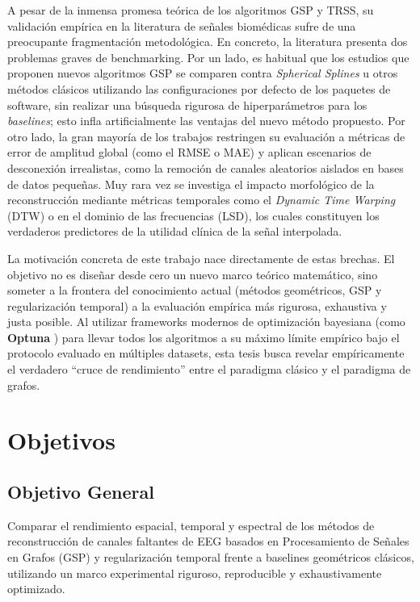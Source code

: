 A pesar de la inmensa promesa teórica de los algoritmos GSP y TRSS, su validación empírica en la literatura de señales biomédicas sufre de una preocupante fragmentación metodológica. En concreto, la literatura presenta dos problemas graves de benchmarking. Por un lado, es habitual que los estudios que proponen nuevos algoritmos GSP se comparen contra \textit{Spherical Splines} u otros métodos clásicos utilizando las configuraciones por defecto de los paquetes de software, sin realizar una búsqueda rigurosa de hiperparámetros para los \textit{baselines}; esto infla artificialmente las ventajas del nuevo método propuesto. Por otro lado, la gran mayoría de los trabajos restringen su evaluación a métricas de error de amplitud global (como el RMSE o MAE) y aplican escenarios de desconexión irrealistas, como la remoción de canales aleatorios aislados en bases de datos pequeñas. Muy rara vez se investiga el impacto morfológico de la reconstrucción mediante métricas temporales como el \textit{Dynamic Time Warping} (DTW) o en el dominio de las frecuencias (LSD), los cuales constituyen los verdaderos predictores de la utilidad clínica de la señal interpolada.

La motivación concreta de este trabajo nace directamente de estas brechas. El objetivo no es diseñar desde cero un nuevo marco teórico matemático, sino someter a la frontera del conocimiento actual (métodos geométricos, GSP y regularización temporal) a la evaluación empírica más rigurosa, exhaustiva y justa posible. Al utilizar frameworks modernos de optimización bayesiana (como \textbf{Optuna} \cite{akiba2019optuna}) para llevar todos los algoritmos a su máximo límite empírico bajo el protocolo evaluado en múltiples datasets, esta tesis busca revelar empíricamente el verdadero ``cruce de rendimiento'' entre el paradigma clásico y el paradigma de grafos.

\section{Objetivos}

\subsection{Objetivo General}
Comparar el rendimiento espacial, temporal y espectral de los métodos de reconstrucción de canales faltantes de EEG basados en Procesamiento de Señales en Grafos (GSP) y regularización temporal frente a baselines geométricos clásicos, utilizando un marco experimental riguroso, reproducible y exhaustivamente optimizado.

